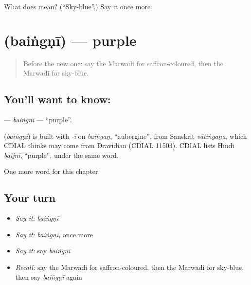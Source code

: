 \begin{tcolorbox}[breakable,colback=teal!4,colframe=teal!35!black,title={Before you move on}]
What does  mean? (\textquotedblleft{}Sky-blue\textquotedblright{}.) Say it once more.
\end{tcolorbox}
\section[\texorpdfstring{\mw{बैंगणी} (baiṅgṇī)}{बैंगणी (baiṅgṇī)}]{ (baiṅgṇī) — purple}

\label{lesson:MW-C145-baingni}



\begin{quote}
Before the new one: say the Marwadi for saffron-coloured, then the Marwadi for sky-blue.
\end{quote}

\subsection*{You'll want to know: }
\textbf{} — \emph{baiṅgṇī} — \textquotedblleft{}purple\textquotedblright{}.

\begin{cousinweb}
\textbf{} (\emph{baiṅgṇī}) is built with \emph{-ī} on \emph{baiṅgaṇ}, \textquotedblleft{}aubergine\textquotedblright{}, from Sanskrit \emph{vātiṅgaṇa}, which CDIAL thinks may come from Dravidian (CDIAL 11503). CDIAL lists Hindi \emph{baĩjnī}, \textquotedblleft{}purple\textquotedblright{}, under the same word.
\end{cousinweb}

\begin{grammarlens}[title={What you've built}]
One more word for this chapter.
\end{grammarlens}

\subsection*{Your turn}
\begin{itemize}
\raggedright
  \item \emph{Say it:} \emph{baiṅgṇī}
  \item \emph{Say it:} \emph{baiṅgṇī}, once more
  \item \emph{Say it:} say \emph{baiṅgṇī}
  \item \emph{Recall:} say the Marwadi for saffron-coloured, then the Marwadi for sky-blue, then say \emph{baiṅgṇī} again
\end{itemize}

